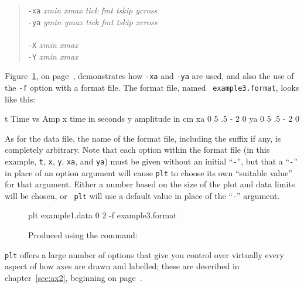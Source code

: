 \documentclass{book}
\begin{document}
\begin{quote}
{\tt -xa} \emph{xmin xmax tick fmt tskip ycross}\\
{\tt -ya} \emph{ymin ymax tick fmt tskip xcross}\\
\\
{\tt -X} \emph{xmin xmax}\\
{\tt -Y} \emph{xmin xmax}
\end{quote}

%
%
%
Figure~\ref{fig:example3}, on page~\pageref{fig:example3},
demonstrates how {\tt -xa} and {\tt -ya} are used, and also the use of
the {\tt -f} option with a format file.  The format file, named {\tt
example3.format}, looks like this:

\begin{center}
\begin{boxedverbatim}
t Time vs Amp
x time in seconds
y amplitude in cm
xa 0 5 .5 - 2 0
ya 0 5 .5 - 2 0
\end{boxedverbatim}
\end{center}

As for the data file, the name of the format file, including the
suffix if any, is completely arbitrary.  Note that each option within
the format file (in this example, {\tt t}, {\tt x}, {\tt y}, {\tt xa},
and {\tt ya}) must be given without an initial ``{\tt -}'', but that a
``{\tt -}'' in place of an option argument will cause {\tt plt} to
choose its own ``suitable value'' for that argument.  Either a number
based on the size of the plot and data limits will be chosen, or {\tt
plt} will use a default value in place of the ``{\tt -}'' argument.

\begin{figure}[h]
\begin{center}
\end{center}
\caption[Using a format file]{Produced using the command: \label{fig:example3}}
\begin{center}
\begin{boxedverbatim}
plt example1.data 0 2 -f example3.format
\end{boxedverbatim}
\end{center}
\end{figure}

{\tt plt} offers a large number of options that give you control over
virtually every aspect of how axes are drawn and labelled;  these are
described in chapter~\ref{sec:ax2}, beginning on page~\pageref{sec:ax2}.
\end{document}
